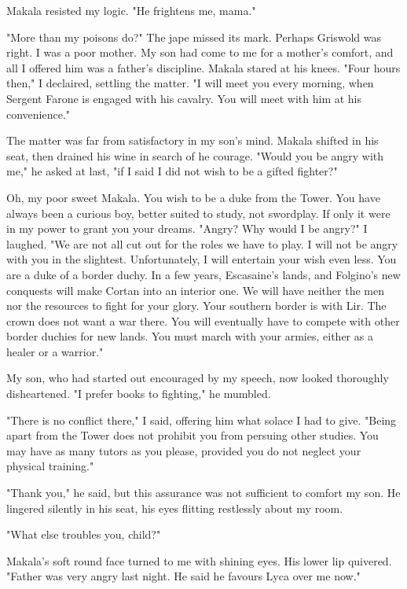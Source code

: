 \documentclass{article}
\begin{document}
Makala resisted my logic. "He frightens me, mama."

"More than my poisons do?" The jape missed its mark. Perhaps Griswold was right. I was a poor mother. My son had come to me for a mother's comfort, and all I offered him was a father's discipline. Makala stared at his knees. "Four hours then," I declaired, settling the matter. "I will meet you every morning, when Sergent Farone is engaged with his cavalry. You will meet with him at his convenience."

The matter was far from satisfactory in my son's mind. Makala shifted in his seat, then drained his wine in search of he courage. "Would you be angry with me," he asked at last, "if I said I did not wish to be a gifted fighter?"

Oh, my poor sweet Makala. You wish to be a duke from the Tower. You have always been a curious boy, better suited to study, not swordplay. If only it were in my power to grant you your dreams. "Angry? Why would I be angry?" I laughed. "We are not all cut out for the roles we have to play. I will not be angry with you in the slightest. Unfortunately, I will entertain your wish even less. You are a duke of a border duchy. In a few years, Escasaine's lands, and Folgino's new conquests will make Cortan into an interior one. We will have neither the men nor the resources to fight for your glory. Your southern border is with Lir. The crown does not want a war there. You will eventually have to compete with other border duchies for new lands. You must march with your armies, either as a healer or a warrior."

My son, who had started out encouraged by my speech, now looked thoroughly disheartened. "I prefer books to fighting," he mumbled.

"There is no conflict there," I said, offering him what solace I had to give. "Being apart from the Tower does not prohibit you from persuing other studies. You may have as many tutors as you please, provided you do not neglect your physical training."

"Thank you," he said, but this assurance was not sufficient to comfort my son. He lingered silently in his seat, his eyes flitting restlessly about my room.

"What else troubles you, child?"

Makala's soft round face turned to me with shining eyes. His lower lip quivered. "Father was very angry last night. He said he favours Lyca over me now."
\end{document}
